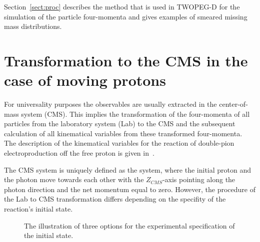 Section~\ref{sect:proc} describes the method that is used in TWOPEG-D for the simulation of the particle four-momenta and gives examples of smeared missing mass distributions.




\section{Transformation to the CMS in the case of moving protons}

For universality purposes the observables are usually extracted in the center-of-mass system (CMS). This implies the transformation of the four-momenta of all particles from the laboratory system (Lab) to the CMS and the subsequent calculation of all kinematical variables from these transformed four-momenta. The description of the kinematical variables for the reaction of double-pion electroproduction off the free proton is given in~\cite{twopeg, Byckling:1971vca,  Fed_an_note:2017}. 



The CMS system is uniquely defined as the system, where the initial proton and the photon move towards each other with the $Z_{CMS}$-axis pointing along the photon direction and the net momentum equal to zero. However, the procedure of the Lab to CMS transformation differs depending on the specifity of the reaction's initial state. 

\begin{figure}[!ht]
\begin{center}
\end{center}
\caption{\small  The illustration of three options for the experimental specification of the initial state.}
\label{fig:lab_to_CMS}
\end{figure}

